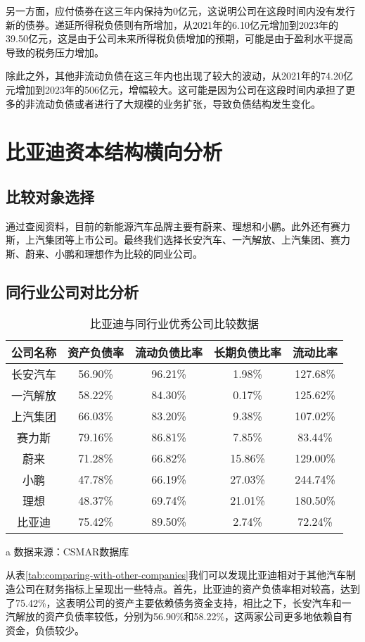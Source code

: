 另一方面，应付债券在这三年内保持为0亿元，这说明公司在这段时间内没有发行新的债券。递延所得税负债则有所增加，从2021年的6.10亿元增加到2023年的39.50亿元，这是由于公司未来所得税负债增加的预期，可能是由于盈利水平提高导致的税务压力增加。

除此之外，其他非流动负债在这三年内也出现了较大的波动，从2021年的74.20亿元增加到2023年的506亿元，增幅较大。这可能是因为公司在这段时间内承担了更多的非流动负债或者进行了大规模的业务扩张，导致负债结构发生变化。

\section{比亚迪资本结构横向分析}
\subsection{比较对象选择}
通过查阅资料，目前的新能源汽车品牌主要有蔚来、理想和小鹏。此外还有赛力斯，上汽集团等上市公司。最终我们选择长安汽车、一汽解放、上汽集团、赛力斯、蔚来、小鹏和理想作为比较的同业公司。
\subsection{同行业公司对比分析}
\begin{table}
  \centering
  \begin{threeparttable}[c]
    \caption{比亚迪与同行业优秀公司比较数据}
    \label{tab:comparing-with-other-companies}
    \begin{tabular}{ccccc}
      \toprule
        公司名称 & 资产负债率 & 流动负债比率 & 长期负债比率 & 流动比率  \\ 
      \midrule
        长安汽车 & 56.90\% & 96.21\% & 1.98\% & 127.68\% \\ 
        一汽解放 & 58.22\% & 84.30\% & 0.17\% & 125.62\% \\ 
        上汽集团 & 66.03\% & 83.20\% & 9.38\% & 107.02\% \\ 
        赛力斯 & 79.16\% & 86.81\% & 7.85\% & 83.44\% \\ 
        蔚来 & 71.28\% & 66.82\% & 15.86\% & 129.00\% \\ 
        小鹏 & 47.78\% & 66.19\% & 27.03\% & 244.74\% \\ 
        理想 & 48.37\% & 69.74\% & 21.01\% & 180.50\% \\ 
        比亚迪 & 75.42\% & 89.50\% & 2.74\% & 72.24\% \\ 
      \bottomrule
    \end{tabular}
    \begin{tablenotes}
      \item [a] 数据来源：CSMAR数据库
    \end{tablenotes}
  \end{threeparttable}
\end{table}
从表\eqref{tab:comparing-with-other-companies}我们可以发现比亚迪相对于其他汽车制造公司在财务指标上呈现出一些特点。首先，比亚迪的资产负债率相对较高，达到了75.42\%，这表明公司的资产主要依赖债务资金支持，相比之下，长安汽车和一汽解放的资产负债率较低，分别为56.90\%和58.22\%，这两家公司更多地依赖自有资金，负债较少。


